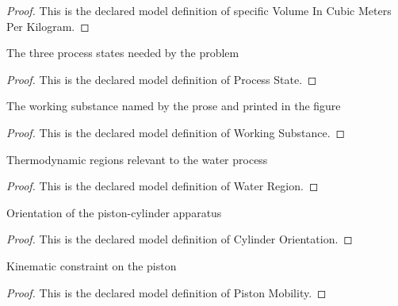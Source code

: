 \begin{proof}
  This is the declared model definition of specific Volume In Cubic Meters Per Kilogram.
\end{proof}
\begin{definition}
  \label{def:physics:phyx-mini-0446:phyxminiproblems-problemphyxmini0446-processstate}
  The three process states needed by the problem
\end{definition}
\begin{proof}
  This is the declared model definition of Process State.
\end{proof}
\begin{definition}
  \label{def:physics:phyx-mini-0446:phyxminiproblems-problemphyxmini0446-workingsubstance}
  The working substance named by the prose and printed in the figure
\end{definition}
\begin{proof}
  This is the declared model definition of Working Substance.
\end{proof}
\begin{definition}
  \label{def:physics:phyx-mini-0446:phyxminiproblems-problemphyxmini0446-waterregion}
  Thermodynamic regions relevant to the water process
\end{definition}
\begin{proof}
  This is the declared model definition of Water Region.
\end{proof}
\begin{definition}
  \label{def:physics:phyx-mini-0446:phyxminiproblems-problemphyxmini0446-cylinderorientation}
  Orientation of the piston-cylinder apparatus
\end{definition}
\begin{proof}
  This is the declared model definition of Cylinder Orientation.
\end{proof}
\begin{definition}
  \label{def:physics:phyx-mini-0446:phyxminiproblems-problemphyxmini0446-pistonmobility}
  Kinematic constraint on the piston
\end{definition}
\begin{proof}
  This is the declared model definition of Piston Mobility.
\end{proof}

